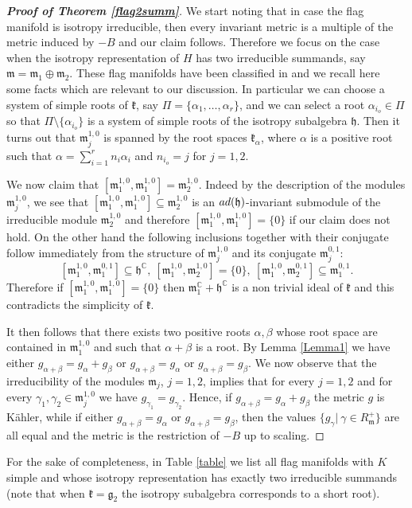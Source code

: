 \documentclass{amsart}
\numberwithin{equation}{section}
\theoremstyle{definition}
\renewcommand{\1}{\mathds{1}}
\renewcommand{\a}{\alpha}
\renewcommand{\b}{\beta}
\newcommand{\g}{\gamma}
\renewcommand{\gg}{\mathfrak g}
\newcommand{\gk}{\mathfrak k}
\newcommand{\gh}{\mathfrak h}
\newcommand{\gm}{\mathfrak m}
\newcommand{\ad}{\rm {ad}}
\renewcommand{\>}{\rightarrow}
\begin{document}
\begin{proof}[\bf{Proof of Theorem \ref{flag2summ}}]  We start noting that in case the flag manifold is isotropy irreducible, then every invariant metric is a multiple of the metric induced by $-B$ and our claim follows. Therefore we focus on the case when the isotropy representation of $H$ has two irreducible summands, say $\gm = \gm_1\oplus \gm_2$. These flag manifolds have been classified in \cite{AC} and we recall here some facts which are relevant to our discussion. In particular we can choose a system of simple roots of $\gk$, say $\Pi=\{\a_1,\ldots,\a_r\}$, and we can select a root $\a_{i_o}\in \Pi$ so that $\Pi\setminus \{\a_{i_o}\}$ is a system of simple roots of the isotropy subalgebra $\gh$. Then it turns out that $\gm_j^{1,0}$ is spanned by the root spaces $\gk_\a$, where $\a$ is a positive root such that $\a=\sum_{i=1}^rn_i\a_i$ and $n_{i_o} = j$ for $j=1,2$.\par
We now claim that $[\gm_1^{1,0},\gm_1^{1,0}]=\gm_2^{1,0}$. Indeed by the description of the modules $\gm_j^{1,0}$, we see that $[\gm_1^{1,0},\gm_1^{1,0}]\subseteq\gm_2^{1,0}$ is
an $\ad(\gh)$-invariant submodule of the irreducible module $\gm_2^{1,0}$ and therefore $[\gm_1^{1,0},\gm_1^{1,0}]=\{0\}$ if our claim does not hold. On the other hand the following inclusions together with their conjugate follow immediately from the structure of $\gm_j^{1,0}$ and its conjugate $\gm_j^{0,1}$:
$$[\gm_1^{1,0},\gm_1^{0,1}]\subseteq \gh^{\mathbb C},\ [\gm_1^{1,0},\gm_2^{1,0}]=\{0\},\ [\gm_1^{1,0},\gm_2^{0,1}]\subseteq \gm_1^{0,1}.$$
Therefore if $[\gm_1^{1,0},\gm_1^{1,0}]=\{0\}$ then $\gm_1^{\mathbb C} + \gh^{\mathbb C}$ is a non trivial ideal of $\gk$ and this contradicts the simplicity of $\gk$.\par
It then follows that there exists two positive roots $\a,\b$ whose root space are contained in $\gm_1^{1,0}$ and such that $\a+\b$ is a root. By Lemma \ref{Lemma1} we have either
$g_{\a+\b}= g_\a+g_\b$ or $g_{\a+\b}=g_\a$ or $g_{\a+\b}=g_\b$. We now observe that the irreducibility of the modules $\gm_j$, $j=1,2$, implies that for every $j=1,2$ and for every  $\g_1,\g_2\in
\gm_j^{1,0}$ we have $g_{\g_1}=g_{\g_2}$. Hence, if $g_{\a+\b}=g_\a+g_\b$ the metric $g$ is K\"ahler, while if either $g_{\a+\b}=g_\a$ or $g_{\a+\b}=g_\b$, then the values
$\{g_\g|\ \g\in R_\gm^+\}$ are all equal and the metric is the restriction of $-B$ up to scaling.\end{proof}
\medskip
For the sake of completeness, in Table \ref{table} we list all flag manifolds with $K$ simple and whose isotropy representation has exactly two irreducible summands (note that when $\gk=\gg_2$ the isotropy subalgebra corresponds to a short root).
\end{document}
